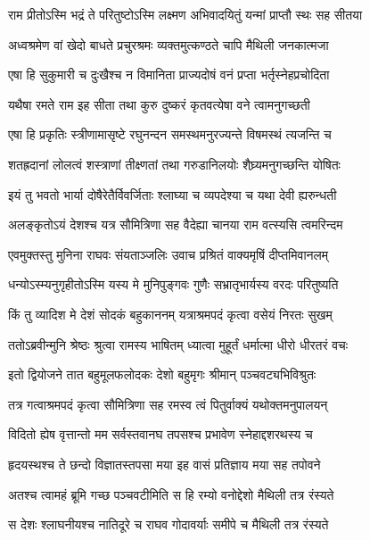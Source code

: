 \twolineshloka
{राम प्रीतोऽस्मि भद्रं ते परितुष्टोऽस्मि लक्ष्मण}
{अभिवादयितुं यन्मां प्राप्तौ स्थः सह सीतया} %

\twolineshloka
{अध्वश्रमेण वां खेदो बाधते प्रचुरश्रमः}
{व्यक्तमुत्कण्ठते चापि मैथिली जनकात्मजा} %

\twolineshloka
{एषा हि सुकुमारी च दुःखैश्च न विमानिता}
{प्राज्यदोषं वनं प्रप्ता भर्तृस्नेहप्रचोदिता} %

\twolineshloka
{यथैषा रमते राम इह सीता तथा कुरु}
{दुष्करं कृतवत्येषा वने त्वामनुगच्छती} %

\twolineshloka
{एषा हि प्रकृतिः स्त्रीणामासृष्टे रघुनन्दन}
{समस्थमनुरज्यन्ते विषमस्थं त्यजन्ति च} %

\twolineshloka
{शतह्रदानां लोलत्वं शस्त्राणां तीक्ष्णतां तथा}
{गरुडानिलयोः शैघ्र्यमनुगच्छन्ति योषितः} %

\twolineshloka
{इयं तु भवतो भार्या दोषैरेतैर्विवर्जिताः}
{श्लाघ्या च व्यपदेश्या च यथा देवी ह्यरुन्धती} %

\twolineshloka
{अलङ्कृतोऽयं देशश्च यत्र सौमित्रिणा सह}
{वैदेह्या चानया राम वत्स्यसि त्वमरिन्दम} %

\twolineshloka
{एवमुक्तस्तु मुनिना राघवः संयताञ्जलिः}
{उवाच प्रश्रितं वाक्यमृषिं दीप्तमिवानलम्} %

\twolineshloka
{धन्योऽस्म्यनुगृहीतोऽस्मि यस्य मे मुनिपुङ्गवः}
{गुणैः सभ्रातृभार्यस्य वरदः परितुष्यति} %

\twolineshloka
{किं तु व्यादिश मे देशं सोदकं बहुकाननम्}
{यत्राश्रमपदं कृत्वा वसेयं निरतः सुखम्} %

\twolineshloka
{ततोऽब्रवीन्मुनि श्रेष्ठः श्रुत्वा रामस्य भाषितम्}
{ध्यात्वा मुहूर्तं धर्मात्मा धीरो धीरतरं वचः} %

\twolineshloka
{इतो द्वियोजने तात बहुमूलफलोदकः}
{देशो बहुमृगः श्रीमान् पञ्चवट्यभिविश्रुतः} %

\twolineshloka
{तत्र गत्वाश्रमपदं कृत्वा सौमित्रिणा सह}
{रमस्व त्वं पितुर्वाक्यं यथोक्तमनुपालयन्} %

\twolineshloka
{विदितो ह्येष वृत्तान्तो मम सर्वस्तवानघ}
{तपसश्च प्रभावेण स्नेहाद्दशरथस्य च} %

\twolineshloka
{हृदयस्थश्च ते छन्दो विज्ञातस्तपसा मया}
{इह वासं प्रतिज्ञाय मया सह तपोवने} %

\twolineshloka
{अतश्च त्वामहं ब्रूमि गच्छ पञ्चवटीमिति}
{स हि रम्यो वनोद्देशो मैथिली तत्र रंस्यते} %

\twolineshloka
{स देशः श्लाघनीयश्च नातिदूरे च राघव}
{गोदावर्याः समीपे च मैथिली तत्र रंस्यते} %

